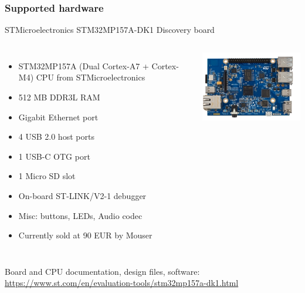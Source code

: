 \begin{frame}
\frametitle{Supported hardware}
  STMicroelectronics STM32MP157A-DK1 Discovery board
  \begin{columns}
    {\footnotesize
    \begin{itemize}
    \item STM32MP157A (Dual Cortex-A7 + Cortex-M4) CPU from STMicroelectronics
    \item 512 MB DDR3L RAM
    \item Gigabit Ethernet port
    \item 4 USB 2.0 host ports
    \item 1 USB-C OTG port
    \item 1 Micro SD slot
    \item On-board ST-LINK/V2-1 debugger
    \item Misc: buttons, LEDs, Audio codec
    \item Currently sold at 90 EUR by Mouser
    \end{itemize}
    }
    \includegraphics[width=\textwidth]{slides/discovery-board-dk1/discovery-board-dk1.png}
  \end{columns}
  \vspace{1em}
  {\small
  Board and CPU documentation, design files, software:
  \url{https://www.st.com/en/evaluation-tools/stm32mp157a-dk1.html}
  }
\end{frame}
